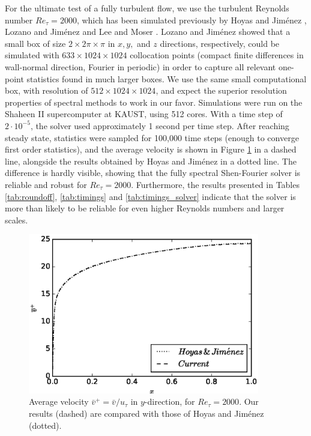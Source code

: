 \documentclass[preprint]{elsarticle}
\newcommand{\D}[1]{\bar{#1}}
\begin{document}
For the ultimate test of a fully turbulent flow, we use the turbulent Reynolds number $Re_{\tau}=2000$, which has been simulated previously by Hoyas and Jim\'{e}nez \cite{hoyas06}, Lozano and Jim\'{e}nez \cite{Lozano2014} and Lee and Moser \cite{leemoser15}. Lozano and Jim\'{e}nez showed that a small box  of size $2 \times 2\pi \times \pi$ in $x, y,$ and $z$ directions, respectively, could be simulated with $633 \times 1024 \times 1024$ collocation points (compact finite differences in wall-normal direction, Fourier in periodic) in order to capture all relevant one-point statistics found in much larger boxes. We use the same small computational box, with resolution of $512 \times 1024 \times 1024$, and expect the superior resolution properties of spectral methods to work in our favor. Simulations were run on the Shaheen II supercomputer at KAUST, using 512 cores. With a time step of $2\cdot10^{-5}$, the solver used approximately 1 second per time step. After reaching steady state, statistics were sampled for 100,000 time steps (enough to converge first order statistics), and the average velocity is shown in Figure \ref{fig:U_mean} in a dashed line, alongside the results obtained by Hoyas and Jim\'{e}nez \cite{hoyas06} in a dotted line. The difference is hardly visible, showing that the fully spectral Shen-Fourier solver is reliable and robust for $Re_{\tau} = 2000$. Furthermore, the results presented in Tables \ref{tab:roundoff}, \ref{tab:timings} and \ref{tab:timings_solver} indicate that the solver is more than likely to be reliable for even higher Reynolds numbers and larger scales.

\begin{figure}[t]
	\begin{center}
	\includegraphics[width=0.9\textwidth]{U_Re2000.eps}
	\caption{Average velocity $\D{v}^+ = \D{v}/u_{\tau}$ in $y$-direction, for $Re_{\tau}=2000$. Our results (dashed) are compared with those of Hoyas and Jim\'{e}nez \cite{hoyas06} (dotted).}
	\label{fig:U_mean}
	\end{center}
\end{figure}
\end{document}
